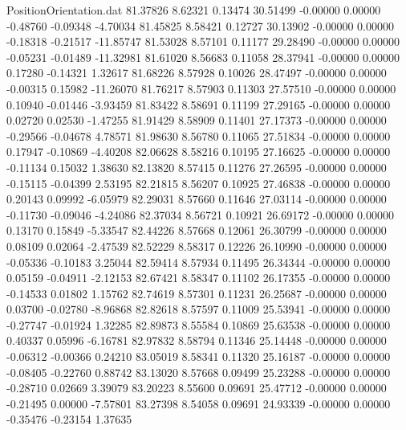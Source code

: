 \begin{filecontents}{PositionOrientation.dat}
  81.37826    8.62321    0.13474    30.51499   -0.00000    0.00000   -0.48760   -0.09348   -4.70034
  81.45825    8.58421    0.12727    30.13902   -0.00000    0.00000   -0.18318   -0.21517  -11.85747
  81.53028    8.57101    0.11177    29.28490   -0.00000    0.00000   -0.05231   -0.01489  -11.32981
  81.61020    8.56683    0.11058    28.37941   -0.00000    0.00000    0.17280   -0.14321    1.32617
  81.68226    8.57928    0.10026    28.47497   -0.00000    0.00000   -0.00315    0.15982  -11.26070
  81.76217    8.57903    0.11303    27.57510   -0.00000    0.00000    0.10940   -0.01446   -3.93459
  81.83422    8.58691    0.11199    27.29165   -0.00000    0.00000    0.02720    0.02530   -1.47255
  81.91429    8.58909    0.11401    27.17373   -0.00000    0.00000   -0.29566   -0.04678    4.78571
  81.98630    8.56780    0.11065    27.51834   -0.00000    0.00000    0.17947   -0.10869   -4.40208
  82.06628    8.58216    0.10195    27.16625   -0.00000    0.00000   -0.11134    0.15032    1.38630
  82.13820    8.57415    0.11276    27.26595   -0.00000    0.00000   -0.15115   -0.04399    2.53195
  82.21815    8.56207    0.10925    27.46838   -0.00000    0.00000    0.20143    0.09992   -6.05979
  82.29031    8.57660    0.11646    27.03114   -0.00000    0.00000   -0.11730   -0.09046   -4.24086
  82.37034    8.56721    0.10921    26.69172   -0.00000    0.00000    0.13170    0.15849   -5.33547
  82.44226    8.57668    0.12061    26.30799   -0.00000    0.00000    0.08109    0.02064   -2.47539
  82.52229    8.58317    0.12226    26.10990   -0.00000    0.00000   -0.05336   -0.10183    3.25044
  82.59414    8.57934    0.11495    26.34344   -0.00000    0.00000    0.05159   -0.04911   -2.12153
  82.67421    8.58347    0.11102    26.17355   -0.00000    0.00000   -0.14533    0.01802    1.15762
  82.74619    8.57301    0.11231    26.25687   -0.00000    0.00000    0.03700   -0.02780   -8.96868
  82.82618    8.57597    0.11009    25.53941   -0.00000    0.00000   -0.27747   -0.01924    1.32285
  82.89873    8.55584    0.10869    25.63538   -0.00000    0.00000    0.40337    0.05996   -6.16781
  82.97832    8.58794    0.11346    25.14448   -0.00000    0.00000   -0.06312   -0.00366    0.24210
  83.05019    8.58341    0.11320    25.16187   -0.00000    0.00000   -0.08405   -0.22760    0.88742
  83.13020    8.57668    0.09499    25.23288   -0.00000    0.00000   -0.28710    0.02669    3.39079
  83.20223    8.55600    0.09691    25.47712   -0.00000    0.00000   -0.21495    0.00000   -7.57801
  83.27398    8.54058    0.09691    24.93339   -0.00000    0.00000   -0.35476   -0.23154    1.37635

\end{filecontents}
